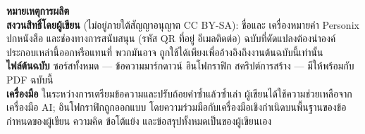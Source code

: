 \clearpage
\thispagestyle{empty}
\begin{flushleft}\small\sffamily
\textbf{หมายเหตุการผลิต}\\[1.2em]

\textbf{สงวนสิทธิ์โดยผู้เขียน} (ไม่อยู่ภายใต้สัญญาอนุญาต CC BY-SA): ชื่อและ
เครื่องหมายคำ Personix ปกหนังสือ และช่องทางการสนับสนุน (รหัส QR ที่อยู่
อีเมลติดต่อ) ฉบับที่ดัดแปลงต้องนำองค์ประกอบเหล่านี้ออกหรือแทนที่ พวกมันอาจ
ถูกใช้ได้เพียงเพื่ออ้างอิงถึงงานต้นฉบับนี้เท่านั้น\\[1.2em]

\textbf{ไฟล์ต้นฉบับ} ซอร์สทั้งหมด --- ข้อความมาร์กดาวน์ อินโฟกราฟิก
สคริปต์การสร้าง --- มีให้พร้อมกับ PDF ฉบับนี้\\[1.2em]

\textbf{เครื่องมือ} ในระหว่างการเตรียมข้อความและปรับถ้อยคำซ้ำแล้วซ้ำเล่า
ผู้เขียนได้ใช้ความช่วยเหลือจากเครื่องมือ AI; อินโฟกราฟิกถูกออกแบบ
โดยความร่วมมือกับเครื่องมือเชิงกำเนิดบนพื้นฐานของข้อกำหนดของผู้เขียน
ความคิด ข้อโต้แย้ง และข้อสรุปทั้งหมดเป็นของผู้เขียนเอง
\end{flushleft}
\clearpage

